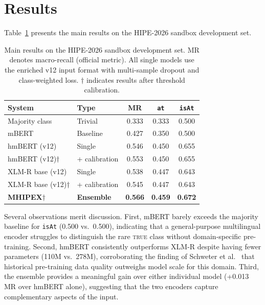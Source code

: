 
\section{Results}
\label{sec:results}

Table~\ref{tab:main} presents the main results on the HIPE-2026 sandbox development set.

\begin{table}[t]
\centering
\caption{Main results on the HIPE-2026 sandbox development set. MR denotes macro-recall (official metric). All single models use the enriched v12 input format with multi-sample dropout and class-weighted loss. $\dagger$ indicates results after threshold calibration.}
\label{tab:main}
\begin{tabular}{llccc}
\toprule
\textbf{System} & \textbf{Type} & \textbf{MR} & \textbf{\texttt{at}} & \textbf{\texttt{isAt}} \\
\midrule
Majority class & Trivial & 0.333 & 0.333 & 0.500 \\
mBERT & Baseline & 0.427 & 0.350 & 0.500 \\
\midrule
hmBERT (v12) & Single & 0.546 & 0.450 & 0.655 \\
hmBERT (v12)$\dagger$ & + calibration & 0.553 & 0.450 & 0.655 \\
XLM-R base (v12) & Single & 0.538 & 0.447 & 0.643 \\
XLM-R base (v12)$\dagger$ & + calibration & 0.545 & 0.447 & 0.643 \\
\midrule
\textbf{MHIPEX}$\dagger$ & \textbf{Ensemble} & \textbf{0.566} & \textbf{0.459} & \textbf{0.672} \\
\bottomrule
\end{tabular}
\end{table}

Several observations merit discussion. First, mBERT barely exceeds the majority baseline for \texttt{isAt} (0.500 vs.\ 0.500), indicating that a general-purpose multilingual encoder struggles to distinguish the rare \textsc{true} class without domain-specific pre-training. Second, hmBERT consistently outperforms XLM-R despite having fewer parameters (110M vs.\ 278M), corroborating the finding of Schweter et al.~\cite{schweter2022} that historical pre-training data quality outweighs model scale for this domain. Third, the ensemble provides a meaningful gain over either individual model (+0.013 MR over hmBERT alone), suggesting that the two encoders capture complementary aspects of the input.

